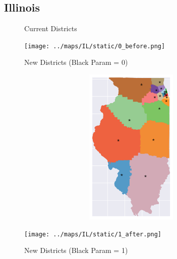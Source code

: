 \subsection{Illinois}
\begin{figure}[htb!] \centering
\caption{ Current Districts }
\texttt{[image: ../maps/IL/static/0\_before.png]}
\caption{ New Districts (Black Param = 0) }
\includegraphics[width=5in,height=3in,keepaspectratio]{../maps/IL/static/0_after.png}
\caption{ New Districts (Black Param = 1) }
\texttt{[image: ../maps/IL/static/1\_after.png]}
\end{figure}

\clearpage
\newpage

